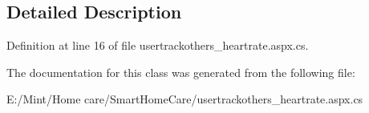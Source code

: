 \subsection{Detailed Description}


Definition at line 16 of file usertrackothers\-\_\-heartrate.\-aspx.\-cs.



The documentation for this class was generated from the following file\-:\begin{DoxyCompactItemize}
\item 
E\-:/\-Mint/\-Home care/\-Smart\-Home\-Care/usertrackothers\-\_\-heartrate.\-aspx.\-cs\end{DoxyCompactItemize}
